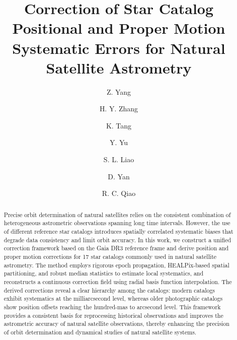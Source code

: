 \documentclass[linenumbers,amsmath,manuscript]{aastex702}
\begin{document}
\title{Correction of Star Catalog Positional and Proper Motion Systematic Errors for Natural Satellite Astrometry}

\author{Z. Yang}

\author{H. Y. Zhang}

\author{K. Tang}

\author{Y. Yu}

\author{S. L. Liao}

\author{D. Yan}

\author{R. C. Qiao}

\begin{abstract}

Precise orbit determination of natural satellites relies on the consistent combination of heterogeneous astrometric observations spanning long time intervals. However, the use of different reference star catalogs introduces spatially correlated systematic biases that degrade data consistency and limit orbit accuracy. In this work, we construct a unified correction framework based on the Gaia DR3 reference frame and derive position and proper motion corrections for 17 star catalogs commonly used in natural satellite astrometry. The method employs rigorous epoch propagation, HEALPix-based spatial partitioning, and robust median statistics to estimate local systematics, and reconstructs a continuous correction field using radial basis function interpolation. The derived corrections reveal a clear hierarchy among the catalogs: modern catalogs exhibit systematics at the milliarcsecond level, whereas older photographic catalogs show position offsets reaching the hundred-mas to arcsecond level. This framework provides a consistent basis for reprocessing historical observations and improves the astrometric accuracy of natural satellite observations, thereby enhancing the precision of orbit determination and dynamical studies of natural satellite systems.

\end{abstract}
\end{document}
